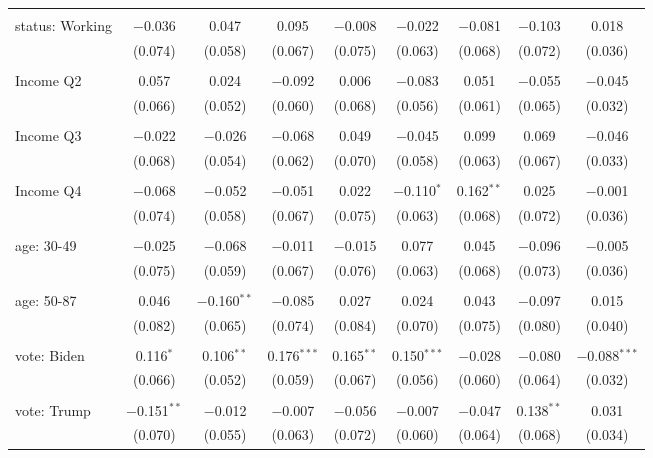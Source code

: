 \begin{tabular}{@{\extracolsep{5pt}}lcccccccc}
  & & & & & & & & \\ 
 status: Working & $-$0.036 & 0.047 & 0.095 & $-$0.008 & $-$0.022 & $-$0.081 & $-$0.103 & 0.018 \\ 
  & (0.074) & (0.058) & (0.067) & (0.075) & (0.063) & (0.068) & (0.072) & (0.036) \\ 
  & & & & & & & & \\ 
 Income Q2 & 0.057 & 0.024 & $-$0.092 & 0.006 & $-$0.083 & 0.051 & $-$0.055 & $-$0.045 \\ 
  & (0.066) & (0.052) & (0.060) & (0.068) & (0.056) & (0.061) & (0.065) & (0.032) \\ 
  & & & & & & & & \\ 
 Income Q3 & $-$0.022 & $-$0.026 & $-$0.068 & 0.049 & $-$0.045 & 0.099 & 0.069 & $-$0.046 \\ 
  & (0.068) & (0.054) & (0.062) & (0.070) & (0.058) & (0.063) & (0.067) & (0.033) \\ 
  & & & & & & & & \\ 
 Income Q4 & $-$0.068 & $-$0.052 & $-$0.051 & 0.022 & $-$0.110$^{*}$ & 0.162$^{**}$ & 0.025 & $-$0.001 \\ 
  & (0.074) & (0.058) & (0.067) & (0.075) & (0.063) & (0.068) & (0.072) & (0.036) \\ 
  & & & & & & & & \\ 
 age: 30-49 & $-$0.025 & $-$0.068 & $-$0.011 & $-$0.015 & 0.077 & 0.045 & $-$0.096 & $-$0.005 \\ 
  & (0.075) & (0.059) & (0.067) & (0.076) & (0.063) & (0.068) & (0.073) & (0.036) \\ 
  & & & & & & & & \\ 
 age: 50-87 & 0.046 & $-$0.160$^{**}$ & $-$0.085 & 0.027 & 0.024 & 0.043 & $-$0.097 & 0.015 \\ 
  & (0.082) & (0.065) & (0.074) & (0.084) & (0.070) & (0.075) & (0.080) & (0.040) \\ 
  & & & & & & & & \\ 
 vote: Biden & 0.116$^{*}$ & 0.106$^{**}$ & 0.176$^{***}$ & 0.165$^{**}$ & 0.150$^{***}$ & $-$0.028 & $-$0.080 & $-$0.088$^{***}$ \\ 
  & (0.066) & (0.052) & (0.059) & (0.067) & (0.056) & (0.060) & (0.064) & (0.032) \\ 
  & & & & & & & & \\ 
 vote: Trump & $-$0.151$^{**}$ & $-$0.012 & $-$0.007 & $-$0.056 & $-$0.007 & $-$0.047 & 0.138$^{**}$ & 0.031 \\ 
  & (0.070) & (0.055) & (0.063) & (0.072) & (0.060) & (0.064) & (0.068) & (0.034) \\ 

\end{tabular}
